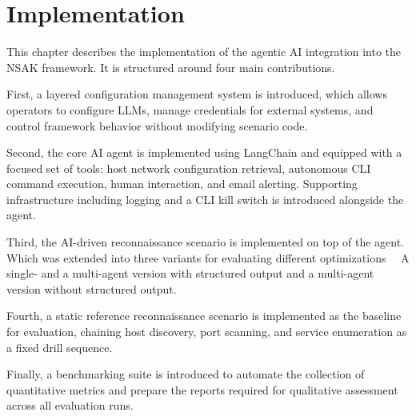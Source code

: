 
\chapter{Implementation}\label{ch:implementation}

This chapter describes the implementation of the agentic \gls{AI} integration into the \gls{NSAK} framework.
It is structured around four main contributions.

First, a layered configuration management system is introduced,
which allows operators to configure \glspl{LLM},
manage credentials for external systems,
and control framework behavior without modifying scenario code.

Second, the core \gls{AI} agent is implemented using \gls{LangChain}
and equipped with a focused set of tools:
host network configuration retrieval, autonomous \gls{CLI} command execution, human interaction, and email alerting.
Supporting infrastructure including logging and a \gls{CLI} kill switch is introduced alongside the agent.

Third, the \gls{AI}-driven reconnaissance scenario is implemented on top of the agent.
Which was extended into three variants for evaluating different optimizations~\textthreequartersemdash~
A single- and a multi-agent version with structured output and a multi-agent version without structured output.

Fourth, a static reference reconnaissance scenario is implemented as the
baseline for evaluation, chaining host discovery, port scanning, and service
enumeration as a fixed drill sequence.

Finally, a benchmarking suite is introduced to automate the collection of
quantitative metrics and prepare the reports required for qualitative
assessment across all evaluation runs.
